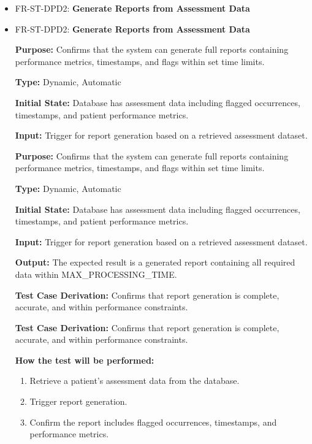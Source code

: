 \documentclass[12pt, titlepage]{article}
\begin{document}
\begin{itemize}
  \item FR-ST-DPD2: \textbf{Generate Reports from Assessment Data}
  \item FR-ST-DPD2: \textbf{Generate Reports from Assessment Data}
  \begin{mdframed}[linewidth=0.5mm]
      \textbf{Purpose:} Confirms that the system can generate full reports containing \\ performance metrics, timestamps, and flags within set time limits. \par
      \textbf{Type:} Dynamic, Automatic \par
      \textbf{Initial State:} Database has assessment data including flagged occurrences, \\ timestamps, and patient performance metrics. \par
      \textbf{Input:} Trigger for report generation based on a retrieved assessment dataset. \par
      \textbf{Purpose:} Confirms that the system can generate full reports containing \\ performance metrics, timestamps, and flags within set time limits. \par
      \textbf{Type:} Dynamic, Automatic \par
      \textbf{Initial State:} Database has assessment data including flagged occurrences, \\ timestamps, and patient performance metrics. \par
      \textbf{Input:} Trigger for report generation based on a retrieved assessment dataset. \par
      \textbf{Output:} The expected result is a generated report containing all required data within MAX\_PROCESSING\_TIME. \par
      \textbf{Test Case Derivation:} Confirms that report generation is complete, accurate, and within performance constraints. \par
      \textbf{Test Case Derivation:} Confirms that report generation is complete, accurate, and within performance constraints. \par
      \textbf{How the test will be performed:}
      \begin{enumerate}[noitemsep]
        \item Retrieve a patient’s assessment data from the database.
        \item Trigger report generation.
        \item Confirm the report includes flagged occurrences, timestamps, and performance metrics.

\end{enumerate}
\end{mdframed}
\end{itemize}
\end{document}
